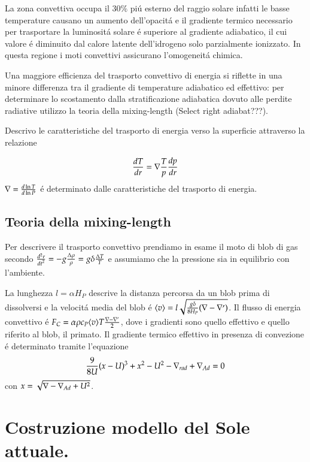 \documentclass[oneside,12pt]{memoir}
\begin{document}
La zona convettiva occupa il $30\%$ pi\'u esterno del raggio solare infatti le basse temperature causano un aumento dell'opacit\'a e il gradiente termico necessario per trasportare la luminosit\'a solare \'e superiore al gradiente adiabatico, il cui valore \'e diminuito dal calore latente dell'idrogeno solo parzialmente ionizzato. In questa regione i moti convettivi assicurano l'omogeneit\'a chimica.

Una maggiore efficienza del trasporto convettivo di energia si riflette in una minore differenza tra il gradiente di temperature adiabatico ed effettivo: per determinare lo scostamento dalla stratificazione adiabatica dovuto alle perdite radiative utilizzo la teoria della mixing-length (Select right adiabat???).

Descrivo le caratteristiche del trasporto di energia verso la superficie attraverso la relazione

\begin{equation}
    \TDy{r}{T}=\nabla\frac{T}{p}\TDy{r}{p}
\end{equation}
$\nabla=\TDly{P}{T}$ \'e determinato dalle caratteristiche del trasporto di energia.

\subsection{Teoria della mixing-length}

Per descrivere il trasporto convettivo prendiamo in esame il moto di blob di gas secondo $\TtwoDy{t}{r}=-g\frac{\Delta\rho}{\rho}=g\delta\frac{\Delta T}{T}$ e assumiamo che la pressione sia in equilibrio con l'ambiente.

La lunghezza $l=\alpha H_P$ descrive la distanza percorsa da un blob prima di dissolversi e la velocit\'a media del blob \'e $\exv{v}=l\sqrt{\frac{g\delta}{8H_P}(\nabla-\nabla')}$. Il flusso di energia convettivo \'e $F_C=\alpha\rho c_P\exv{v}T\frac{\nabla-\nabla'}{2}$, dove i gradienti sono quello effettivo e quello riferito al blob, il primato. Il gradiente termico effettivo in presenza di convezione \'e determinato tramite l'equazione
\begin{equation}
\frac{9}{8U}(x-U)^3+x^2-U^2-\nrad{}+\nad{}=0\label{eq:mixingcubic}
\end{equation}
con $x=\sqrt{\nabla-\nad{}+U^2}$.




\section{Costruzione modello del Sole attuale.}
\end{document}
